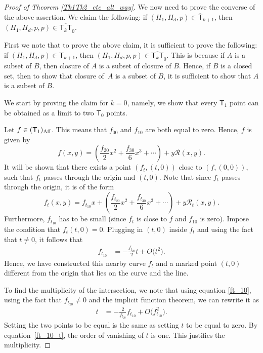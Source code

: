 \documentclass[pdftex]{sigma}
\numberwithin{equation}{section}
\begin{document}
\begin{proof}[Proof of Theorem \ref{Tk1Tk2_etc_alt_way}]
We now need to prove the converse of the above assertion.
We claim the following: if $(H_1, H_d, p) \in \overline{\mathsf{T}}_{k+1}$,
then $(H_1, H_d, p, p) \in \overline{\mathsf{T}_{k} \mathsf{T}}_0$.

First we note that to prove the above claim, it is sufficient to prove the following:
if $(H_1, H_d, p) \in \mathsf{T}_{k+1}$,
then $(H_1, H_d, p, p) \in \overline{\mathsf{T}_{k} \mathsf{T}}_0$.
This is because if $A$ is a subset of $B$, then closure of $A$ is a subset of
closure of $B$. Hence, if $B$ is a closed set, then to show that closure of~$A$
is a subset of $B$, it is sufficient to show that $A$ is a subset of $B$.

We start by proving the claim for $k = 0$, namely, we show that
every $\mathsf{T}_1$ point can be obtained as a limit to two $\mathsf{T}_0$ points.

Let $f \in (\mathsf{T}_1)_{\textnormal{Aff}}$. This means that $f_{00}$ and $f_{10}$ are both equal to zero.
Hence, $f$ is given by
\[
f(x, y)  =  \left(\frac{f_{20}}{2} x^2 + \frac{f_{30}}{6} x^3 + \cdots\right) + y \mathcal{R}(x, y).
\]
It will be shown that there exists a point $(f_t, (t, 0))$ close to $(f, (0, 0))$, such that
$f_t$ passes through the origin and $(t, 0)$. Note that
since $f_t$ passes through the origin, it is of the form
\[
f_t(x, y) = f_{t_{10}}x+ \left(\frac{f_{t_{20}}}{2} x^2 + \frac{f_{t_{30}}}{6} x^3 +\cdots\right) +
y \mathcal{R}_t(x, y).
\]
Furthermore, $f_{t_{10}}$ has to be small (since $f_t$ is close to $f$ and $f_{10}$ is zero).
Impose the condition that $f_{t}(t, 0) = 0$. Plugging in $(t, 0)$ inside $f_t$ and using the fact
that $t \neq 0$, it follows that
\begin{align}
f_{t_{10}}&= -\frac{f_{t_{20}}}{2} t + O\bigl(t^2\bigr). \label{ft_10}
\end{align}
Hence, we have constructed this nearby curve $f_t$ and a marked point $(t, 0)$ different from the origin
that lies on the curve and the line.

To find the multiplicity of the intersection, we note that using equation \eqref{ft_10},
using the fact that $f_{t_{20}} \neq 0$
and the implicit function theorem, we can rewrite it as
\begin{align}
t & = -\frac{2}{f_{t_{20}}} f_{t_{10}} + O\bigl(f_{t_{10}}^2\bigr). \label{ft_10_t}
\end{align}
Setting the two points to be equal is the same as setting $t$ to be equal to zero.
By equation~\eqref{ft_10_t}, the order of vanishing of $t$ is one. This
justifies the multiplicity.


\end{proof}
\end{document}
